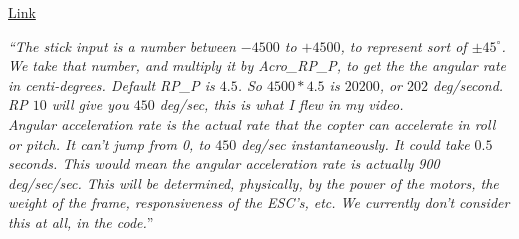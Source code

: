 \href{https://groups.google.com/forum/#!topic/drones-discuss/PGJC7Oejd5A}{Link}

\textit{``The stick input is a number between $-4500$ to $+4500$, to represent sort of $\pm 45^{\circ}$.  We take that number, and multiply it by Acro\_RP\_P, to get the the angular rate in centi-degrees.  Default RP\_P is $4.5$.  So $4500*4.5$ is $20200$, or $202$ deg/second. RP $10$ will give you $450$ deg/sec, this is what I flew in my video.  \\
%
Angular acceleration rate is the actual rate that the copter can accelerate in roll or pitch.  It can't jump from 0, to $450$ deg/sec instantaneously.  It could take $0.5$ seconds.  This would mean the angular acceleration rate is actually 900 deg/sec/sec.  This will be determined, physically, by the power of the motors, the weight of the frame, responsiveness of the ESC's, etc. We currently don't consider this at all, in the code.}''